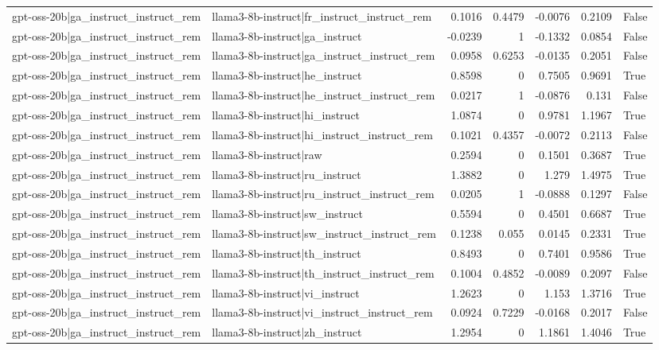\begin{table}
\begin{tabular}{l l r r r r l}
gpt-oss-20b|ga_instruct_instruct_rem & llama3-8b-instruct|fr_instruct_instruct_rem & 0.1016 & 0.4479 & -0.0076 & 0.2109 & False \\
gpt-oss-20b|ga_instruct_instruct_rem & llama3-8b-instruct|ga_instruct & -0.0239 & 1 & -0.1332 & 0.0854 & False \\
gpt-oss-20b|ga_instruct_instruct_rem & llama3-8b-instruct|ga_instruct_instruct_rem & 0.0958 & 0.6253 & -0.0135 & 0.2051 & False \\
gpt-oss-20b|ga_instruct_instruct_rem & llama3-8b-instruct|he_instruct & 0.8598 & 0 & 0.7505 & 0.9691 & True \\
gpt-oss-20b|ga_instruct_instruct_rem & llama3-8b-instruct|he_instruct_instruct_rem & 0.0217 & 1 & -0.0876 & 0.131 & False \\
gpt-oss-20b|ga_instruct_instruct_rem & llama3-8b-instruct|hi_instruct & 1.0874 & 0 & 0.9781 & 1.1967 & True \\
gpt-oss-20b|ga_instruct_instruct_rem & llama3-8b-instruct|hi_instruct_instruct_rem & 0.1021 & 0.4357 & -0.0072 & 0.2113 & False \\
gpt-oss-20b|ga_instruct_instruct_rem & llama3-8b-instruct|raw & 0.2594 & 0 & 0.1501 & 0.3687 & True \\
gpt-oss-20b|ga_instruct_instruct_rem & llama3-8b-instruct|ru_instruct & 1.3882 & 0 & 1.279 & 1.4975 & True \\
gpt-oss-20b|ga_instruct_instruct_rem & llama3-8b-instruct|ru_instruct_instruct_rem & 0.0205 & 1 & -0.0888 & 0.1297 & False \\
gpt-oss-20b|ga_instruct_instruct_rem & llama3-8b-instruct|sw_instruct & 0.5594 & 0 & 0.4501 & 0.6687 & True \\
gpt-oss-20b|ga_instruct_instruct_rem & llama3-8b-instruct|sw_instruct_instruct_rem & 0.1238 & 0.055 & 0.0145 & 0.2331 & True \\
gpt-oss-20b|ga_instruct_instruct_rem & llama3-8b-instruct|th_instruct & 0.8493 & 0 & 0.7401 & 0.9586 & True \\
gpt-oss-20b|ga_instruct_instruct_rem & llama3-8b-instruct|th_instruct_instruct_rem & 0.1004 & 0.4852 & -0.0089 & 0.2097 & False \\
gpt-oss-20b|ga_instruct_instruct_rem & llama3-8b-instruct|vi_instruct & 1.2623 & 0 & 1.153 & 1.3716 & True \\
gpt-oss-20b|ga_instruct_instruct_rem & llama3-8b-instruct|vi_instruct_instruct_rem & 0.0924 & 0.7229 & -0.0168 & 0.2017 & False \\
gpt-oss-20b|ga_instruct_instruct_rem & llama3-8b-instruct|zh_instruct & 1.2954 & 0 & 1.1861 & 1.4046 & True \\

\end{tabular}
\end{table}
